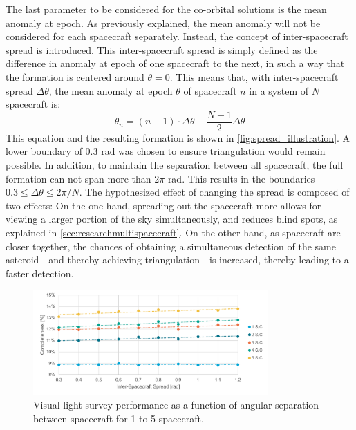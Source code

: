 The last parameter to be considered for the co-orbital solutions is the mean anomaly at epoch. As previously explained, the mean anomaly will not be considered for each spacecraft separately. Instead, the concept of inter-spacecraft spread is introduced. This inter-spacecraft spread is simply defined as the difference in anomaly at epoch of one spacecraft to the next, in such a way that the formation is centered around $\theta=0$. This means that, with inter-spacecraft spread $\Delta \theta$, the mean anomaly at epoch $\theta$ of spacecraft $n$ in a system of $N$ spacecraft is:
\begin{equation}
 \theta_n = (n-1) \cdot \Delta \theta - \frac{N-1}{2}\Delta \theta
\end{equation}
This equation and the resulting formation is shown in \autoref{fig:spread_illustration}. A lower boundary of 0.3 rad was chosen to ensure triangulation would remain possible. In addition, to maintain the separation between all spacecraft, the full formation can not span more than $2\pi$ rad. This results in the boundaries $0.3 \leq \Delta \theta \leq 2\pi/N$. The hypothesized effect of changing the spread is composed of two effects: On the one hand, spreading out the spacecraft more allows for viewing a larger portion of the sky simultaneously, and reduces blind spots, as explained in \autoref{sec:researchmultispacecraft}. On the other hand, as spacecraft are closer together, the chances of obtaining a simultaneous detection of the same asteroid - and thereby achieving triangulation - is increased, thereby leading to a faster detection.\\

\begin{figure}[htbp]
 \centering
 \includegraphics[width=0.8\textwidth]{img/vis_spread.pdf}
 \caption{Visual light survey performance as a function of angular separation between spacecraft for 1 to 5 spacecraft.}
 \label{fig:vis_spread}
\end{figure}

